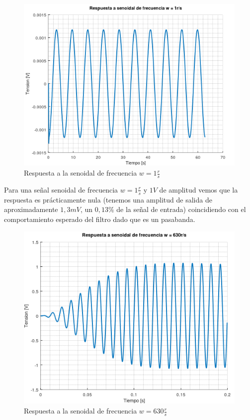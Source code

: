 \documentclass[11pt,a4paper]{report}
\begin{document}
\begin{figure}[h!]
\includegraphics[scale=0.96]{RtaSenoidalBajo.png}
\caption{Respuesta a la senoidal de frecuencia $w = 1\frac{r}{s}$}
\end{figure}

Para una señal senoidal de frecuencia $w = 1\frac{r}{s}$ y $1V$ de amplitud vemos que la respuesta es prácticamente nula (tenemos una amplitud de salida de aproximadamente $1,3mV$, un $0,13\%$ de la señal de entrada) coincidiendo con el comportamiento esperado del filtro dado que es un pasabanda. 

\newpage
\begin{figure}[h!]
\includegraphics[scale=1]{RtaSenoidalMedio.png}
\caption{Respuesta a la senoidal de frecuencia $w = 630\frac{r}{s}$}
\end{figure}
\end{document}
